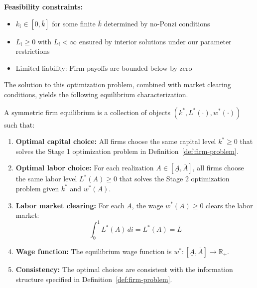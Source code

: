 \documentclass[12pt]{article}
\begin{document}
\begin{definition}
\textbf{Feasibility constraints:}
\begin{itemize}
    \item $k_i \in [0, \bar{k}]$ for some finite $\bar{k}$ determined by no-Ponzi conditions
    \item $L_i \geq 0$ with $L_i < \infty$ ensured by interior solutions under our parameter restrictions
    \item Limited liability: Firm payoffs are bounded below by zero
\end{itemize}
\end{definition}

The solution to this optimization problem, combined with market clearing conditions, yields the following equilibrium characterization.

\begin{definition}
A symmetric firm equilibrium is a collection of objects $(k^*, L^*(\cdot), w^*(\cdot))$ such that:
\begin{enumerate}
    \item \textbf{Optimal capital choice:} All firms choose the same capital level $k^* \geq 0$ that solves the Stage 1 optimization problem in Definition~\ref{def:firm-problem}.
    \item \textbf{Optimal labor choice:} For each realization $A \in [\underline{A}, \overline{A}]$, all firms choose the same labor level $L^*(A) \geq 0$ that solves the Stage 2 optimization problem given $k^*$ and $w^*(A)$.
    \item \textbf{Labor market clearing:} For each $A$, the wage $w^*(A) \geq 0$ clears the labor market:
    \begin{equation}
        \int_0^1 L^*(A) \, di = L^*(A) = \overline{L}
    \end{equation}
    \item \textbf{Wage function:} The equilibrium wage function is $w^*: [\underline{A}, \overline{A}] \to \mathbb{R}_+$.
    \item \textbf{Consistency:} The optimal choices are consistent with the information structure specified in Definition~\ref{def:firm-problem}.
\end{enumerate}
\end{definition}
\end{document}
